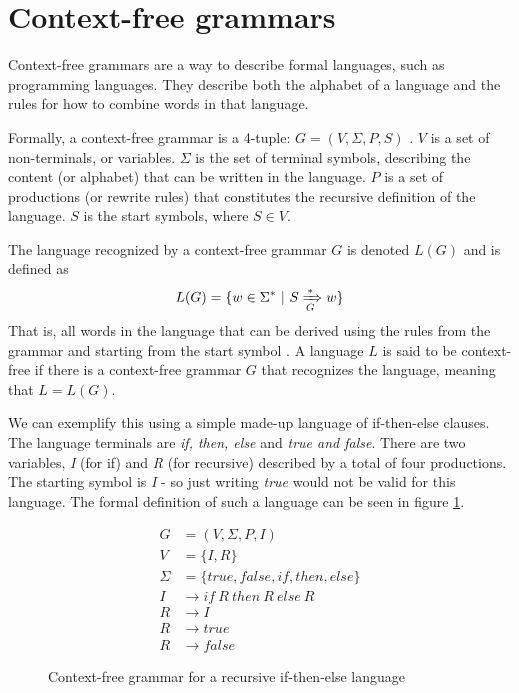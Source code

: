\documentclass[a4paper,12pt,twosided]{report}
\begin{document}
\section{Context-free grammars}
Context-free grammars are a way to describe formal languages, such as
programming languages. They describe both the alphabet of a language and the
rules for how to combine words in that language.

Formally, a context-free grammar is a 4-tuple: $G = (V, \Sigma, P, S)$
\cite[p.171]{automatabook}. $V$ is a set of non-terminals, or variables. $\Sigma$ is
the set of terminal symbols, describing the content (or alphabet) that can be
written in the language.  $P$ is a set of productions (or rewrite rules) that
constitutes the recursive definition of the language. $S$ is the start symbols,
where $S \in V$. 

The language recognized by a context-free grammar $G$ is denoted $L(G)$ and is
defined as 
\[
L(G) = \{w \in \Sigma^* \ |\  S \xRightarrow[G]{*} w\}
\]
That is, all words in the language that can be derived using the rules from the
grammar and starting from the start symbol \cite[p. 177]{automatabook}.  A
language $L$ is said to be context-free if there is a context-free grammar $G$
that recognizes the language, meaning that $L = L(G)$.

We can exemplify this using a simple made-up language of if-then-else clauses.
The language terminals are \textit{if, then, else} and \textit{true and false}.
There are two variables, \textit{I} (for if) and \textit{R} (for recursive)
described by a total of four productions. The starting symbol is \textit{I} - so
just writing \textit{true} would not be valid for this language. The formal
definition of such a language can be seen in figure \ref{iflang}.

\begin{figure}[H]
\begin{align*}
G &= (V, \Sigma , P, I) \\
V &= \{I,R\} \\
\Sigma &= \{true,false,if,then,else\} \\
I &\rightarrow if\ R\ then\ R\ else\ R \\
R &\rightarrow I \\
R &\rightarrow true \\
R &\rightarrow false
\end{align*}
\caption{Context-free grammar for a recursive if-then-else language}
\label{iflang}
\end{figure}
\end{document}
